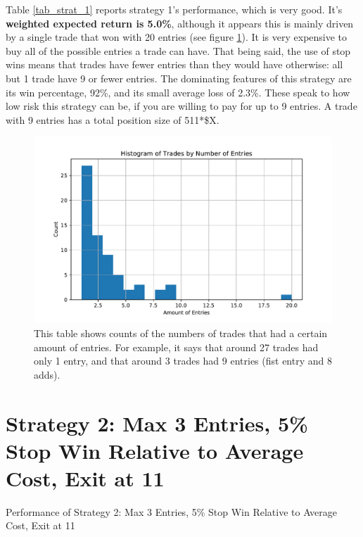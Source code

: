 \documentclass{article}
\begin{document}
Table \ref{tab_strat_1} reports strategy 1's performance, which is very good. It's \textbf{weighted expected return is 5.0\%}, although it appears this is mainly driven by a single trade that won with 20 entries (see figure \ref{hist_strat_1}). It is very expensive to buy all of the possible entries a trade can have. That being said, the use of stop wins means that trades have fewer entries than they would have otherwise: all but 1 trade have 9 or fewer entries. The dominating features of this strategy are its win percentage, 92\%, and its small average loss of 2.3\%. These speak to how low risk this strategy can be, if you are willing to pay for up to 9 entries. A trade with 9 entries has a total position size of 511*\$X.

\begin{figure}
	\includegraphics[width=\textwidth]{prog_entry_stop_win_hist.pdf}
	\caption{This table shows counts of the numbers of trades that had a certain amount of entries. For example, it says that around 27 trades had only 1 entry, and that around 3 trades had 9 entries (fist entry and 8 adds).}
	\label{hist_strat_1}
	\end{figure}
\pagebreak

\section{Strategy 2: Max 3 Entries, 5\% Stop Win Relative to Average Cost, Exit at 11} 


\begin{table}
\caption{Performance of Strategy 2: Max 3 Entries, 5\% Stop Win Relative to Average Cost, Exit at 11}
\\[2ex]


\\[2ex]


\\[2ex]

\label{tab_strat_2}
\end{table}
\end{document}
